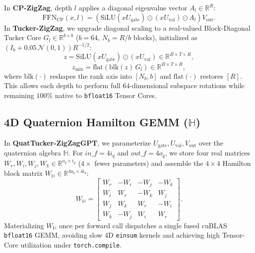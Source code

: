 \documentclass[10pt,twocolumn]{article}
\begin{document}
In \textbf{CP-ZigZag}, depth $l$ applies a diagonal eigenvalue vector $A_l \in \mathbb{R}^R$:
\begin{equation}
    \text{FFN}_{\text{CP}}(x, l) = \left(\text{SiLU}(x U_{\text{gate}}) \odot (x U_{\text{val}}) \odot A_l\right) V_{\text{out}}.
\end{equation}
In \textbf{Tucker-ZigZag}, we upgrade diagonal scaling to a real-valued Block-Diagonal Tucker Core $G_l \in \mathbb{R}^{b \times b}$ ($b=64$, $N_b = R/b$ blocks), initialized as $(I_b + 0.05\,\mathcal{N}(0,1)) R^{-1/2}$:
\begin{equation}
    z = \text{SiLU}(x U_{\text{gate}}) \odot (x U_{\text{val}}) \in \mathbb{R}^{B \times T \times R},
\end{equation}
\begin{equation}
    z_{\text{mix}} = \text{flat}\!\left(\text{blk}(z)\, G_l\right) \in \mathbb{R}^{B \times T \times R},
\end{equation}
where $\text{blk}(\cdot)$ reshapes the rank axis into $[N_b, b]$ and $\text{flat}(\cdot)$ restores $[R]$. This allows each depth to perform full $64$-dimensional subspace rotations while remaining $100\%$ native to \texttt{bfloat16} Tensor Cores.

\subsection{4D Quaternion Hamilton GEMM ($\mathbb{H}$)}
In \textbf{QuatTucker-ZigZagGPT}, we parameterize $U_{\text{gate}}, U_{\text{val}}, V_{\text{out}}$ over the quaternion algebra $\mathbb{H}$. For $in\_f = 4 i_q$ and $out\_f = 4 o_q$, we store four real matrices $W_r, W_i, W_j, W_k \in \mathbb{R}^{o_q \times i_q}$ ($4\times$ fewer parameters) and assemble the $4 \times 4$ Hamilton block matrix $W_{\mathbb{H}} \in \mathbb{R}^{4 o_q \times 4 i_q}$:
\begin{equation}
    W_{\mathbb{H}} = \begin{bmatrix}
    W_r & -W_i & -W_j & -W_k \\
    W_i &  W_r & -W_k &  W_j \\
    W_j &  W_k &  W_r & -W_i \\
    W_k & -W_j &  W_i &  W_r
    \end{bmatrix}.
\end{equation}
Materializing $W_{\mathbb{H}}$ once per forward call dispatches a single fused cuBLAS \texttt{bfloat16} GEMM, avoiding slow 4D \texttt{einsum} kernels and achieving high Tensor-Core utilization under \texttt{torch.compile}.
\end{document}
